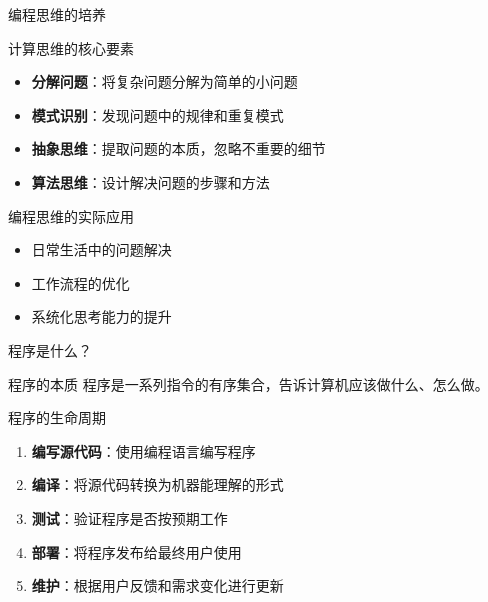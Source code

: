 \documentclass[UTF8,aspectratio=169]{beamer}
\begin{document}
\begin{frame}{编程思维的培养}
    \begin{ytublock}{计算思维的核心要素}
        \begin{itemize}
            \item \textbf{分解问题}：将复杂问题分解为简单的小问题
            \item \textbf{模式识别}：发现问题中的规律和重复模式
            \item \textbf{抽象思维}：提取问题的本质，忽略不重要的细节
            \item \textbf{算法思维}：设计解决问题的步骤和方法
        \end{itemize}
    \end{ytublock}

    \begin{ytublock}{编程思维的实际应用}
        \begin{itemize}
            \item 日常生活中的问题解决
            \item 工作流程的优化
            \item 系统化思考能力的提升
        \end{itemize}
    \end{ytublock}
\end{frame}

\begin{frame}{程序是什么？}
    \begin{ytublock}{程序的本质}
        程序是一系列指令的有序集合，告诉计算机应该做什么、怎么做。
    \end{ytublock}

    \begin{ytublock}{程序的生命周期}
        \begin{enumerate}
            \item \textbf{编写源代码}：使用编程语言编写程序
            \item \textbf{编译}：将源代码转换为机器能理解的形式
            \item \textbf{测试}：验证程序是否按预期工作
            \item \textbf{部署}：将程序发布给最终用户使用
            \item \textbf{维护}：根据用户反馈和需求变化进行更新
        \end{enumerate}
    \end{ytublock}
\end{frame}
\end{document}
